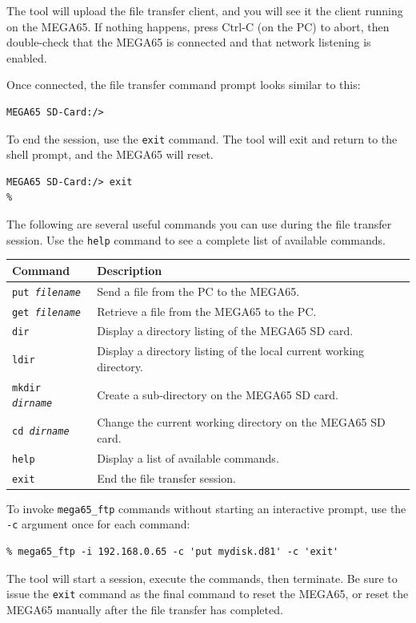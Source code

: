 The tool will upload the file transfer client, and you will see it the client running on the MEGA65. If nothing happens, press Ctrl-C (on the PC) to abort, then double-check that the MEGA65 is connected and that network listening is enabled.

Once connected, the file transfer command prompt looks similar to this:

\begin{verbatim}
MEGA65 SD-Card:/>
\end{verbatim}

To end the session, use the {\tt exit} command. The tool will exit and return to the shell prompt, and the MEGA65 will reset.

\begin{verbatim}
MEGA65 SD-Card:/> exit
%
\end{verbatim}

The following are several useful commands you can use during the file transfer session. Use the {\tt help} command to see a complete list of available commands.

\begin{center}
\begin{tabular}{|l|l|}
\hline
{\bf Command} & {\bf Description} \\
\hline
{\tt put {\it filename}} & Send a file from the PC to the MEGA65. \\
\hline
{\tt get {\it filename}} & Retrieve a file from the MEGA65 to the PC. \\
\hline
{\tt dir} & Display a directory listing of the MEGA65 SD card. \\
\hline
{\tt ldir} & Display a directory listing of the local current working directory. \\
\hline
{\tt mkdir {\it dirname}} & Create a sub-directory on the MEGA65 SD card. \\
\hline
{\tt cd {\it dirname}} & Change the current working directory on the MEGA65 SD card. \\
\hline
{\tt help} & Display a list of available commands. \\
\hline
{\tt exit} & End the file transfer session. \\
\hline
\end{tabular}
\end{center}

To invoke {\tt mega65\_ftp} commands without starting an interactive prompt, use the {\tt -c} argument once for each command:

\begin{verbatim}
% mega65_ftp -i 192.168.0.65 -c 'put mydisk.d81' -c 'exit'
\end{verbatim}

The tool will start a session, execute the commands, then terminate. Be sure to issue the {\tt exit} command as the final command to reset the MEGA65, or reset the MEGA65 manually after the file transfer has completed.